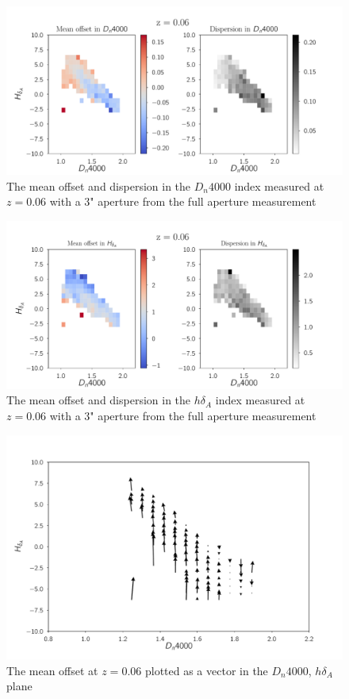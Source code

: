 \begin{figure}
\includegraphics[width=\textwidth]{figures/z6b.pdf}
\caption[Short figure name.]{ The mean offset and dispersion in the $D_{n}4000$ index measured at $z = 0.06$ with a $3$" aperture from the full aperture measurement
\label{fig:myInlineFigure}}
\end{figure}

\begin{figure}
\includegraphics[width=\textwidth]{figures/z6c.pdf}
\caption[Short figure name.]{ The mean offset and dispersion in the $h\delta_{A}$ index measured at $z = 0.06$ with a $3$" aperture from the full aperture measurement 
\label{fig:myInlineFigure}}
\end{figure}

\begin{figure}
\includegraphics[width=\textwidth]{figures/z6d.pdf}
\caption[Short figure name.]{ The mean offset at $z=0.06$ plotted as a vector in the $D_{n}4000$, $h\delta_{A}$ plane
\label{fig:myInlineFigure}}
\end{figure}


